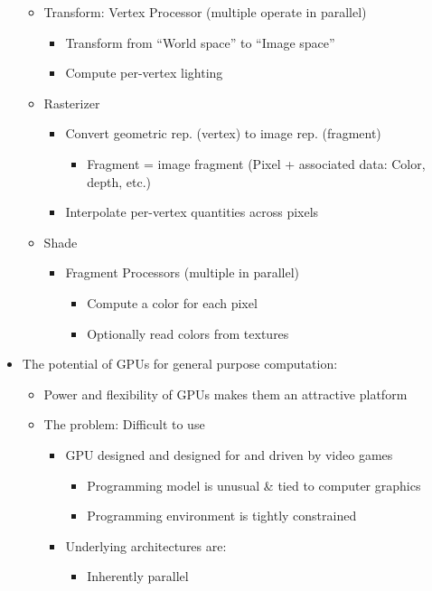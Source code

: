 \documentclass[a4paper]{article}
\begin{document}
\begin{itemize}
\begin{itemize}
\item Transform: Vertex Processor (multiple operate in parallel)
\begin{itemize}
\item Transform from ``World space'' to ``Image space''
\item Compute per-vertex lighting
\end{itemize}
\item Rasterizer
\begin{itemize}
\item Convert geometric rep. (vertex) to image rep. (fragment)
\begin{itemize}
\item Fragment = image fragment (Pixel + associated data: Color, depth, etc.)
\end{itemize}
\item Interpolate per-vertex quantities across pixels
\end{itemize}
\item Shade
\begin{itemize}
\item Fragment Processors (multiple in parallel)
\begin{itemize}
\item Compute a color for each pixel
\item Optionally read colors from textures
\end{itemize}
\end{itemize}
\end{itemize}
\item The potential of GPUs for general purpose computation:
\begin{itemize}
\item Power and flexibility of GPUs makes them an attractive platform
\item The problem: Difficult to use
\begin{itemize}
\item GPU designed and designed for and driven by video games
\begin{itemize}
\item Programming model is unusual \& tied to computer graphics
\item Programming environment is tightly constrained
\end{itemize}
\item Underlying architectures are:\begin{itemize}
\item Inherently parallel

\end{itemize}
\end{itemize}
\end{itemize}
\end{itemize}
\end{document}
